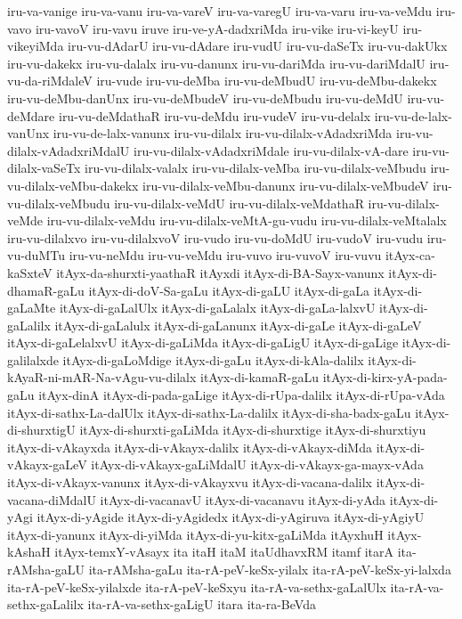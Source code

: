 {iru-va-vanige
iru-va-vanu
iru-va-vareV
iru-va-varegU
iru-va-varu
iru-va-veMdu
iru-vavo
iru-vavoV
iru-vavu
iruve
iru-ve-yA-dadxriMda
iru-vike
iru-vi-keyU
iru-vikeyiMda
iru-vu-dAdarU
iru-vu-dAdare
iru-vudU
iru-vu-daSeTx
iru-vu-dakUkx
iru-vu-dakekx
iru-vu-dalalx
iru-vu-danunx
iru-vu-dariMda
iru-vu-dariMdalU
iru-vu-da-riMdaleV
iru-vude
iru-vu-deMba
iru-vu-deMbudU
iru-vu-deMbu-dakekx
iru-vu-deMbu-danUnx
iru-vu-deMbudeV
iru-vu-deMbudu
iru-vu-deMdU
iru-vu-deMdare
iru-vu-deMdathaR
iru-vu-deMdu
iru-vudeV
iru-vu-delalx
iru-vu-de-lalx-vanUnx
iru-vu-de-lalx-vanunx
iru-vu-dilalx
iru-vu-dilalx-vAdadxriMda
iru-vu-dilalx-vAdadxriMdalU
iru-vu-dilalx-vAdadxriMdale
iru-vu-dilalx-vA-dare
iru-vu-dilalx-vaSeTx
iru-vu-dilalx-valalx
iru-vu-dilalx-veMba
iru-vu-dilalx-veMbudu
iru-vu-dilalx-veMbu-dakekx
iru-vu-dilalx-veMbu-danunx
iru-vu-dilalx-veMbudeV
iru-vu-dilalx-veMbudu
iru-vu-dilalx-veMdU
iru-vu-dilalx-veMdathaR
iru-vu-dilalx-veMde
iru-vu-dilalx-veMdu
iru-vu-dilalx-veMtA-gu-vudu
iru-vu-dilalx-veMtalalx
iru-vu-dilalxvo
iru-vu-dilalxvoV
iru-vudo
iru-vu-doMdU
iru-vudoV
iru-vudu
iru-vu-duMTu
iru-vu-neMdu
iru-vu-veMdu
iru-vuvo
iru-vuvoV
iru-vuvu
itAyx-ca-kaSxteV
itAyx-da-shurxti-yaathaR
itAyxdi
itAyx-di-BA-Sayx-vanunx
itAyx-di-dhamaR-gaLu
itAyx-di-doV-Sa-gaLu
itAyx-di-gaLU
itAyx-di-gaLa
itAyx-di-gaLaMte
itAyx-di-gaLalUlx
itAyx-di-gaLalalx
itAyx-di-gaLa-lalxvU
itAyx-di-gaLalilx
itAyx-di-gaLalulx
itAyx-di-gaLanunx
itAyx-di-gaLe
itAyx-di-gaLeV
itAyx-di-gaLelalxvU
itAyx-di-gaLiMda
itAyx-di-gaLigU
itAyx-di-gaLige
itAyx-di-galilalxde
itAyx-di-gaLoMdige
itAyx-di-gaLu
itAyx-di-kAla-dalilx
itAyx-di-kAyaR-ni-mAR-Na-vAgu-vu-dilalx
itAyx-di-kamaR-gaLu
itAyx-di-kirx-yA-pada-gaLu
itAyx-dinA
itAyx-di-pada-gaLige
itAyx-di-rUpa-dalilx
itAyx-di-rUpa-vAda
itAyx-di-sathx-La-dalUlx
itAyx-di-sathx-La-dalilx
itAyx-di-sha-badx-gaLu
itAyx-di-shurxtigU
itAyx-di-shurxti-gaLiMda
itAyx-di-shurxtige
itAyx-di-shurxtiyu
itAyx-di-vAkayxda
itAyx-di-vAkayx-dalilx
itAyx-di-vAkayx-diMda
itAyx-di-vAkayx-gaLeV
itAyx-di-vAkayx-gaLiMdalU
itAyx-di-vAkayx-ga-mayx-vAda
itAyx-di-vAkayx-vanunx
itAyx-di-vAkayxvu
itAyx-di-vacana-dalilx
itAyx-di-vacana-diMdalU
itAyx-di-vacanavU
itAyx-di-vacanavu
itAyx-di-yAda
itAyx-di-yAgi
itAyx-di-yAgide
itAyx-di-yAgidedx
itAyx-di-yAgiruva
itAyx-di-yAgiyU
itAyx-di-yanunx
itAyx-di-yiMda
itAyx-di-yu-kitx-gaLiMda
itAyxhuH
itAyx-kAshaH
itAyx-temxY-vAsayx
ita
itaH
itaM
itaUdhavxRM
itamf
itarA
ita-rAMsha-gaLU
ita-rAMsha-gaLu
ita-rA-peV-keSx-yilalx
ita-rA-peV-keSx-yi-lalxda
ita-rA-peV-keSx-yilalxde
ita-rA-peV-keSxyu
ita-rA-va-sethx-gaLalUlx
ita-rA-va-sethx-gaLalilx
ita-rA-va-sethx-gaLigU
itara
ita-ra-BeVda
}
